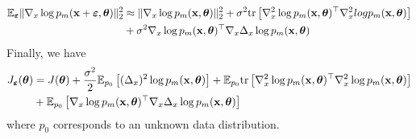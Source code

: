     \begin{align*}
        \mathbb{E}_{{\bm \varepsilon}} \|\nabla_x\log p_m(\mathbf{x} + {\bm \varepsilon}, {\bm \theta})\|_2^2
        &\approx \|\nabla_x\log p_m(\mathbf{x}, {\bm \theta})\|_2^2 + \sigma^2{\rm tr}\left[\nabla_x^2\log p_m(\mathbf{x}, {\bm \theta})^{\top}\nabla_x^2log p_m(\mathbf{x}, {\bm \theta})\right] \\
        &+ \sigma^2 \nabla_x\log p_m(\mathbf{x}, {\bm \theta})^{\top}\nabla_x\Delta_x\log p_m(\mathbf{x}, {\bm \theta})
    \end{align*}
    Finally, we have
    \begin{align*}
        J_{{\bm \varepsilon}}({\bm \theta})
        &= J({\bm \theta}) + \frac{\sigma^2}{2}\mathbb{E}_{p_0}\left[(\Delta_x)^2 \log p_m(\mathbf{x}, {\bm \theta})\right]
       + \mathbb{E}_{p_0}{\rm tr}\left[\nabla_x^2\log p_m(\mathbf{x}, {\bm \theta})^{\top}\nabla_x^2\log p_m(\mathbf{x}, {\bm \theta})\right] \\
        &+ \mathbb{E}_{p_0}\left[\nabla_x\log p_m(\mathbf{x}, {\bm \theta})^{\top}\nabla_x\Delta_x\log p_m(\mathbf{x}, {\bm \theta})\right]
    \end{align*}
    where $p_0$ corresponds to an unknown data distribution.
